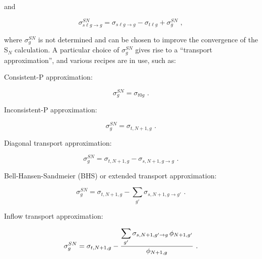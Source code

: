 \noindent
and

  \begin{equation}
    \sigma_{s\ell g\rightarrow g}^{SN}=\sigma_{s\ell g\rightarrow g}
    -\sigma_{t\ell g}+\sigma_g^{SN}\,\,,
  \end{equation}

\noindent
where $\sigma_g^{SN}$ is not determined and can be chosen to improve
the convergence of the S$_N$ calculation.  A particular choice of
$\sigma_g^{SN}$ gives rise to a ``transport approximation'',
and various recipes are in use, such as:

Consistent-P approximation:

  \begin{equation}
    \sigma_g^{SN}=\sigma_{t0g}\,\,.
  \end{equation}

Inconsistent-P approximation:

  \begin{equation}
    \sigma_g^{SN}=\sigma_{t,N+1,g}\,\,.
  \end{equation}

Diagonal transport approximation:

  \begin{equation}
    \sigma_g^{SN}=\sigma_{t,N+1,g}-\sigma_{s,N+1,g\rightarrow g}\,\,.
  \end{equation}

Bell-Hansen-Sandmeier (BHS) or extended transport approximation:

  \begin{equation}
    \sigma_g^{SN}=\sigma_{t,N+1,g}-\sum_{g'}\sigma_{s,N+1,g\rightarrow g'}\,\,.
  \end{equation}

Inflow transport approximation:

  \begin{equation}
    \sigma_g^{SN}=\sigma_{t,N+1,g}-{\displaystyle
    {\sum_{g'}\sigma_{s,N+1,g'\rightarrow g}\,\phi_{N+1,g'}}
    \over\displaystyle{\phi_{N+1,g}}}\,\,.
  \end{equation}

